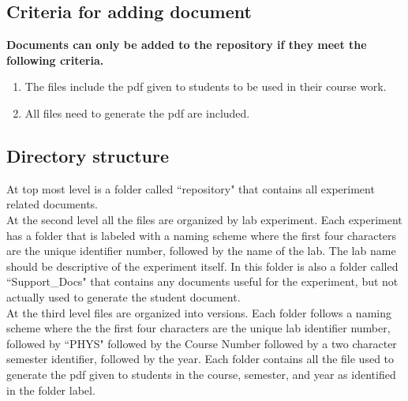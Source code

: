 \documentclass[justified]{book}
\begin{document}
\subsection{Criteria for adding document}

{\bf Documents can only be added to the repository if they meet the following criteria.}
\begin{enumerate}
\item The files include the pdf given to students to be used in their course work.
\item All files need to generate the pdf are included.
\end{enumerate}

\subsection{Directory structure}

At top most level is a folder called ``repository" that contains all experiment related documents.\\

\noindent At the second level all the files are organized by lab experiment. Each experiment has a folder that is labeled with a naming scheme where the first four characters are the unique identifier number, followed by the name of the lab. The lab name should be descriptive of the experiment itself. In this folder is also a folder called ``Support\_Docs" that contains any documents useful for the experiment, but not actually used to generate the student document. \\

\noindent At the third level files are organized into versions. Each folder follows a naming scheme where the the first four characters are the unique lab identifier number, followed by ``PHYS" followed by the Course Number followed by a two character semester identifier, followed by the year. Each folder contains all the file used to generate the pdf given to students in the course, semester, and year as identified in the folder label. \\




\end{document}
